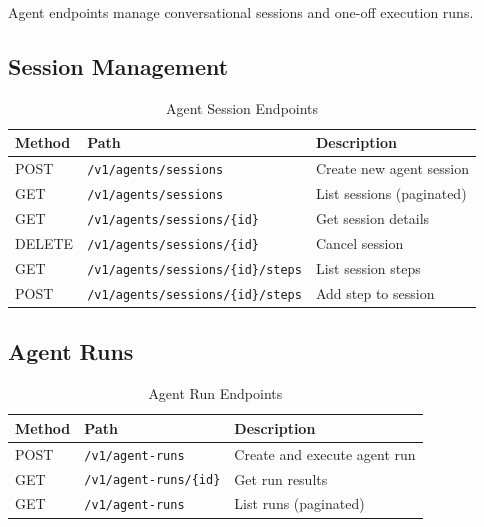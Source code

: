 Agent endpoints manage conversational sessions and one-off execution runs.

\subsection{Session Management}

\begin{table}[ht]
\centering
\caption{Agent Session Endpoints}
\label{tab:agent-session-endpoints}
\small
\begin{tabularx}{\textwidth}{llX}
    \hline
    \textbf{Method} & \textbf{Path} & \textbf{Description} \\
    \hline
    POST & \texttt{/v1/agents/sessions} & Create new agent session \\
    GET & \texttt{/v1/agents/sessions} & List sessions (paginated) \\
    GET & \texttt{/v1/agents/sessions/\{id\}} & Get session details \\
    DELETE & \texttt{/v1/agents/sessions/\{id\}} & Cancel session \\
    GET & \texttt{/v1/agents/sessions/\{id\}/steps} & List session steps \\
    POST & \texttt{/v1/agents/sessions/\{id\}/steps} & Add step to session \\
    \hline
\end{tabularx}
\end{table}

\subsection{Agent Runs}

\begin{table}[ht]
\centering
\caption{Agent Run Endpoints}
\label{tab:agent-run-endpoints}
\small
\begin{tabularx}{\textwidth}{llX}
    \hline
    \textbf{Method} & \textbf{Path} & \textbf{Description} \\
    \hline
    POST & \texttt{/v1/agent-runs} & Create and execute agent run \\
    GET & \texttt{/v1/agent-runs/\{id\}} & Get run results \\
    GET & \texttt{/v1/agent-runs} & List runs (paginated) \\
    \hline
\end{tabularx}
\end{table}

